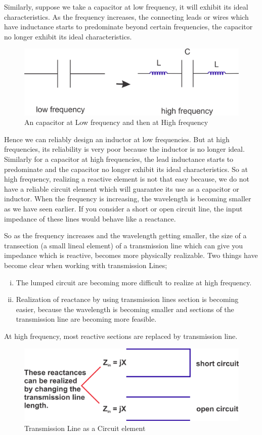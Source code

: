 Similarly, suppose we take a capacitor at low frequency, it will exhibit its ideal characteristics. As the frequency increases, the connecting leads or wires which have inductance starts to predominate beyond certain frequencies, the capacitor no longer exhibit its ideal characteristics.
\begin{figure}[h]
\centering
\includegraphics[width=1\linewidth]{./graphics/group10diagram4}
\caption{An capacitor at Low frequency and then at High frequency}
\end{figure}

Hence we can reliably design an inductor at low frequencies. But at high frequencies, its reliability is very poor because the inductor is no longer ideal. Similarly for a capacitor at high frequencies, the lead inductance starts to predominate and the capacitor no longer exhibit its ideal characteristics. So at high frequency, realizing a reactive element is not that easy because, we do not have a reliable circuit element which will guarantee its use as a capacitor or inductor. When the frequency is increasing, the wavelength is becoming smaller as we have seen earlier. 
If you consider a short or open circuit line, the input impedance of these lines would behave like a reactance.

So as the frequency increases and the wavelength getting smaller, the size of a transection (a small lineal element) of a transmission line which can give you impedance which is reactive, becomes more physically realizable.
Two things have become clear when working with transmission
Lines;
\begin{enumerate}[(i)]
\item The lumped circuit are becoming more difficult to realize at high frequency.
\item Realization of reactance by using transmission lines section is becoming easier, because the wavelength is becoming smaller and sections of the transmission line are becoming more feasible.
\end{enumerate}
At high frequency, most reactive sections are replaced by transmission line.
\begin{figure}[h]
\centering
\includegraphics[width=1\linewidth]{./graphics/group10diagram5}
\caption{Transmission Line as a Circuit element}
\end{figure}

